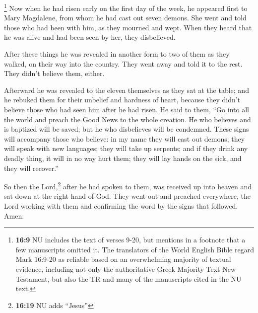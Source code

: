  \footnote{\textbf{16:9} NU includes the text of verses
  9-20, but mentions in a footnote that a few manuscripts omitted it.
  The translators of the World English Bible regard Mark 16:9-20 as
  reliable based on an overwhelming majority of textual evidence,
  including not only the authoritative Greek Majority Text New
  Testament, but also the TR and many of the manuscripts cited in the NU
  text.} Now when he had risen early on the first day of the week, he
appeared first to Mary Magdalene, from whom he had cast out seven
demons.  She went and told those who had been with him,
as they mourned and wept.  When they heard that he was
alive and had been seen by her, they disbelieved.

 After these things he was revealed in another form to
two of them as they walked, on their way into the country.
 They went away and told it to the rest. They didn't
believe them, either.

 Afterward he was revealed to the eleven themselves as
they sat at the table; and he rebuked them for their unbelief and
hardness of heart, because they didn't believe those who had seen him
after he had risen.  He said to them, ``Go into all the
world and preach the Good News to the whole creation.  He
who believes and is baptized will be saved; but he who disbelieves will
be condemned.  These signs will accompany those who
believe: in my name they will cast out demons; they will speak with new
languages;  they will take up serpents; and if they drink
any deadly thing, it will in no way hurt them; they will lay hands on
the sick, and they will recover.''

 So then the Lord,\footnote{\textbf{16:19} NU adds
  ``Jesus''} after he had spoken to them, was received up into heaven
and sat down at the right hand of God.  They went out and
preached everywhere, the Lord working with them and confirming the word
by the signs that followed. Amen.
